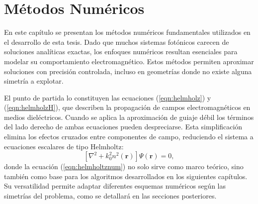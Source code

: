 \chapter{Métodos Numéricos}
En este capítulo se presentan los métodos numéricos fundamentales utilizados en el desarrollo de esta tesis. Dado que muchos sistemas fotónicos carecen de soluciones analíticas exactas, los enfoques numéricos resultan esenciales para modelar su comportamiento electromagnético. Estos métodos permiten aproximar soluciones con precisión controlada, incluso en geometrías donde no existe alguna simetría a explotar.

El punto de partida lo constituyen las ecuaciones (\ref{eqn:helmholz}) y (\ref{eqn:helmholzH}), que describen la propagación de campos electromagnéticos en medios dieléctricos. Cuando se aplica la aproximación de guiaje débil los términos del lado derecho de ambas ecuaciones pueden despreciarse. Esta simplificación elimina los efectos cruzados entre componentes de campo, reduciendo el sistema a ecuaciones escalares de tipo Helmholtz:
\begin{equation}
\left[\nabla^2 + k_0^2 n^2(\textbf{r})\right]\Psi(\textbf{r}) = 0, \label{eqn:helmholtznum}
\end{equation}
donde la ecuación (\ref{eqn:helmholtznum}) no solo sirve como marco teórico, sino también como base para los algoritmos desarrollados en los siguientes capítulos. Su versatilidad permite adaptar diferentes esquemas numéricos según las simetrías del problema, como se detallará en las secciones posteriores.
